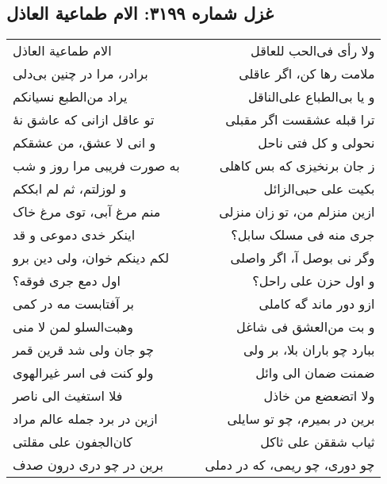 \begin{center}
\section*{غزل شماره ۳۱۹۹: الام طماعیة العاذل}
\label{sec:3199}
\begin{longtable}{l p{0.5cm} r}
الام طماعیة العاذل
&&
ولا رأی فی‌الحب للعاقل
\\
برادر، مرا در چنین بی‌دلی
&&
ملامت رها کن، اگر عاقلی
\\
یراد من‌الطبع نسیانکم
&&
و یا بی‌الطباع علی‌الناقل
\\
تو عاقل ازانی که عاشق نهٔ
&&
ترا قبله عشقست اگر مقبلی
\\
و انی لا عشق، من عشقکم
&&
نحولی و کل فتی ناحل
\\
به صورت فریبی مرا روز و شب
&&
ز جان برنخیزی که بس کاهلی
\\
و لوزلتم، ثم لم ابککم
&&
بکیت علی حبی‌الزائل
\\
منم مرغ آبی، توی مرغ خاک
&&
ازین منزلم من، تو زان منزلی
\\
اینکر خدی دموعی و قد
&&
جری منه فی مسلک سابل؟
\\
لکم دینکم خوان، ولی دین برو
&&
وگر نی بوصل آ، اگر واصلی
\\
اول دمع جری فوقه؟
&&
و اول حزن علی راحل؟
\\
بر آفتابست مه در کمی
&&
ازو دور ماند گه کاملی
\\
وهبت‌السلو لمن لا منی
&&
و بت من‌العشق فی شاغل
\\
چو جان ولی شد قرین قمر
&&
ببارد چو باران بلا، بر ولی
\\
ولو کنت فی اسر غیرالهوی
&&
ضمنت ضمان الی وائل
\\
فلا استغیث الی ناصر
&&
ولا اتضعضع من خاذل
\\
ازین در برد جمله عالم مراد
&&
برین در بمیرم، چو تو سایلی
\\
کان‌الجفون علی مقلتی
&&
ثیاب شققن علی ثاکل
\\
برین در چو دری درون صدف
&&
چو دوری، چو ریمی، که در دملی
\\
\end{longtable}
\end{center}
